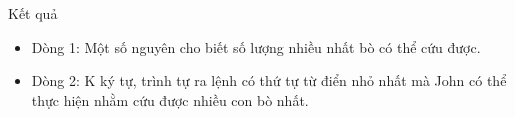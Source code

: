 Kết quả  
\begin{itemize}
	\item     Dòng 1: Một số nguyên cho biết số lượng nhiều nhất bò có thể cứu được.   
	\item     Dòng 2: K ký tự, trình tự ra lệnh có thứ tự từ điển nhỏ nhất mà John có thể thực hiện nhằm cứu được nhiều con bò nhất.   
\end{itemize}
